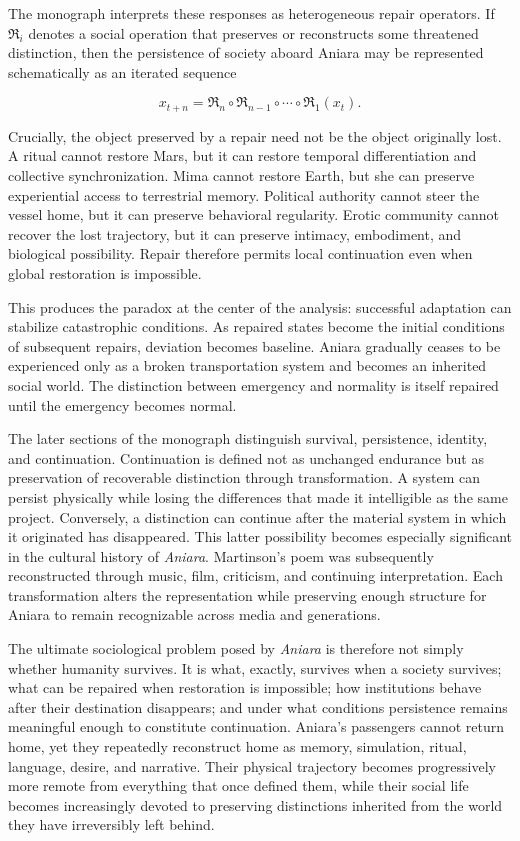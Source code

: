 \documentclass[11pt,oneside]{book}
\theoremstyle{definition}
\theoremstyle{remark}
\newcommand{\Repair}{\mathfrak{R}}
\begin{document}
The monograph interprets these responses as heterogeneous repair operators. If \(\Repair_i\) denotes a social operation that preserves or reconstructs some threatened distinction, then the persistence of society aboard Aniara may be represented schematically as an iterated sequence

\[
x_{t+n}
=
\Repair_n
\circ
\Repair_{n-1}
\circ
\cdots
\circ
\Repair_1(x_t).
\]

Crucially, the object preserved by a repair need not be the object originally lost. A ritual cannot restore Mars, but it can restore temporal differentiation and collective synchronization. Mima cannot restore Earth, but she can preserve experiential access to terrestrial memory. Political authority cannot steer the vessel home, but it can preserve behavioral regularity. Erotic community cannot recover the lost trajectory, but it can preserve intimacy, embodiment, and biological possibility. Repair therefore permits local continuation even when global restoration is impossible.

This produces the paradox at the center of the analysis: successful adaptation can stabilize catastrophic conditions. As repaired states become the initial conditions of subsequent repairs, deviation becomes baseline. Aniara gradually ceases to be experienced only as a broken transportation system and becomes an inherited social world. The distinction between emergency and normality is itself repaired until the emergency becomes normal.

The later sections of the monograph distinguish survival, persistence, identity, and continuation. Continuation is defined not as unchanged endurance but as preservation of recoverable distinction through transformation. A system can persist physically while losing the differences that made it intelligible as the same project. Conversely, a distinction can continue after the material system in which it originated has disappeared. This latter possibility becomes especially significant in the cultural history of \emph{Aniara}. Martinson's poem was subsequently reconstructed through music, film, criticism, and continuing interpretation. Each transformation alters the representation while preserving enough structure for Aniara to remain recognizable across media and generations.

The ultimate sociological problem posed by \emph{Aniara} is therefore not simply whether humanity survives. It is what, exactly, survives when a society survives; what can be repaired when restoration is impossible; how institutions behave after their destination disappears; and under what conditions persistence remains meaningful enough to constitute continuation. Aniara's passengers cannot return home, yet they repeatedly reconstruct home as memory, simulation, ritual, language, desire, and narrative. Their physical trajectory becomes progressively more remote from everything that once defined them, while their social life becomes increasingly devoted to preserving distinctions inherited from the world they have irreversibly left behind.
\end{document}
